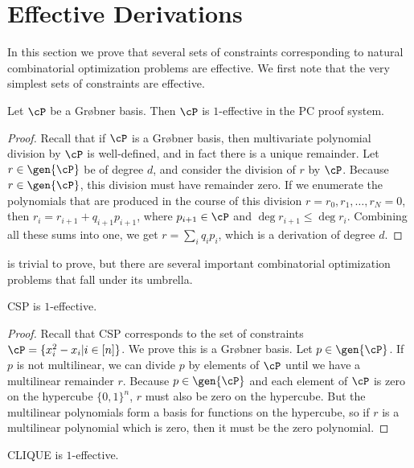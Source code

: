 \chapter{Effective Derivations}
In this section we prove that several sets of constraints corresponding to natural combinatorial optimization problems are effective.
We first note that the very simplest sets of constraints are effective.
\begin{lemma}\label{lem:grobnereffective}
Let $\cP$ be a Gr\o bner basis. Then $\cP$ is $1$-effective in the PC proof system.
\end{lemma}
\begin{proof}
Recall that if $\cP$ is a Gr\o bner basis, then multivariate polynomial division by $\cP$ is well-defined, and in fact there is a unique 
remainder. Let $r \in \gen{\cP}$ be of degree $d$, and consider the division of $r$ by $\cP$. Because $r \in \gen{\cP}$, this division must have
remainder zero. If we enumerate the polynomials that are produced in the course of this division $r = r_0, r_1, \dots, r_N = 0$, then 
$r_i = r_{i+1} + q_{i+1}p_{i+1}$, where $p_{i+1} \in \cP$ and $\deg r_{i+1} \leq \deg r_i$. Combining all these sums into one, we get
$r = \sum_i q_i p_i$, which is a derivation of degree $d$. 
\end{proof}
 is trivial to prove, but there are several important combinatorial optimization problems that fall 
under its umbrella.
\begin{corollary}
\textsc{CSP} is $1$-effective.
\end{corollary}
\begin{proof}
Recall that \textsc{CSP} corresponds to the set of constraints $\cP = \{x_i^2 - x_i | i \in [n]\}$. We prove this is a Gr\o bner basis. 
Let $p \in \gen{\cP}$. If $p$ is not multilinear, we can divide $p$ by elements of $\cP$ until we have a multilinear remainder $r$. Because 
$p \in \gen{\cP}$ and each element of $\cP$ is zero on the hypercube $\{0, 1\}^n$, $r$ must also be zero on the hypercube. But the multilinear
polynomials form a basis for functions on the hypercube, so if $r$ is a multilinear polynomial which is zero, then it must be the zero polynomial. 
\end{proof}
\begin{corollary}
\textsc{CLIQUE} is $1$-effective.
\end{corollary}
